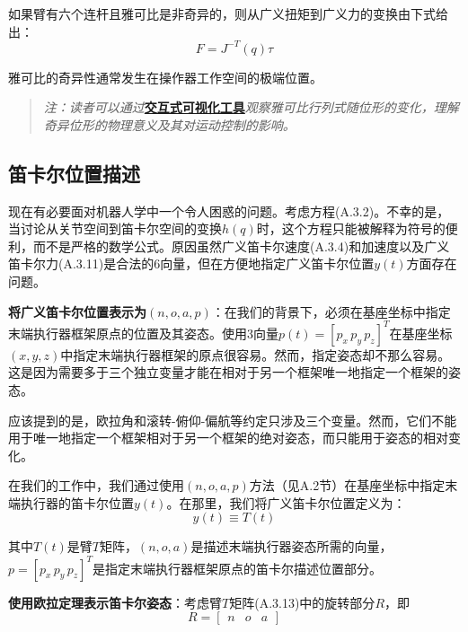 \documentclass[UTF8,a4paper]{ctexart}
\begin{document}
如果臂有六个连杆且雅可比是非奇异的，则从广义扭矩到广义力的变换由下式给出：
\begin{equation}
F = J^{-T}(q)\tau
\tag{A.3.12}
\end{equation}

雅可比的奇异性通常发生在操作器工作空间的极端位置。

\begin{quote}
\textit{注：读者可以通过}\href{https://frankjie09.github.io/Robot-Manipulator-Control-CN/figures/Jacobian_Singularities.html}{\textbf{交互式可视化工具}}\textit{观察雅可比行列式随位形的变化，理解奇异位形的物理意义及其对运动控制的影响。}
\end{quote}

\subsection{笛卡尔位置描述}

现在有必要面对机器人学中一个令人困惑的问题。考虑方程(A.3.2)。不幸的是，当讨论从关节空间到笛卡尔空间的变换$h(q)$时，这个方程只能被解释为符号的便利，而不是严格的数学公式。原因虽然广义笛卡尔速度(A.3.4)和加速度以及广义笛卡尔力(A.3.11)是合法的6向量，但在方便地指定广义笛卡尔位置$y(t)$方面存在问题。

\textbf{将广义笛卡尔位置表示为$(n, o, a, p)$}：在我们的背景下，必须在基座坐标中指定末端执行器框架原点的位置及其姿态。使用3向量$p(t) = [p_x \, p_y \, p_z]^T$在基座坐标$(x, y, z)$中指定末端执行器框架的原点很容易。然而，指定姿态却不那么容易。这是因为需要多于三个独立变量才能在相对于另一个框架唯一地指定一个框架的姿态。

应该提到的是，欧拉角和滚转-俯仰-偏航等约定只涉及三个变量。然而，它们不能用于唯一地指定一个框架相对于另一个框架的绝对姿态，而只能用于姿态的相对变化。

在我们的工作中，我们通过使用$(n, o, a, p)$方法（见A.2节）在基座坐标中指定末端执行器的笛卡尔位置$y(t)$。在那里，我们将广义笛卡尔位置定义为：
\begin{equation}
y(t) \equiv T(t)
\tag{A.3.13}
\end{equation}

其中$T(t)$是臂$T$矩阵，$(n, o, a)$是描述末端执行器姿态所需的向量，$p = [p_x \, p_y \, p_z]^T$是指定末端执行器框架原点的笛卡尔描述位置部分。

\textbf{使用欧拉定理表示笛卡尔姿态}：考虑臂$T$矩阵(A.3.13)中的旋转部分$R$，即
\begin{equation}
R = \begin{bmatrix} n & o & a \end{bmatrix}
\tag{A.3.14}
\end{equation}
\end{document}
